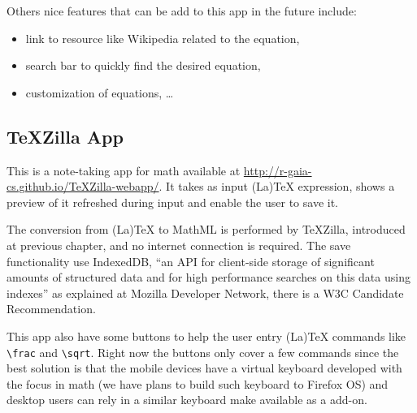 Others nice features that can be add to this app in the
future include:
\begin{itemize}
  \item link to resource like Wikipedia related to the equation,
  \item search bar to quickly find the desired equation,
  \item customization of equations, \ldots
\end{itemize}

\subsection{TeXZilla App}

This is a note-taking app for math available at
\href{http://r-gaia-cs.github.io/TeXZilla-webapp/}{http://r-gaia-cs.github.io/TeXZilla-webapp/}.
It takes as input (La)TeX expression, shows a preview of it refreshed during
input and enable the user to save it.

The conversion from (La)TeX to MathML is performed by TeXZilla, introduced at
previous chapter, and no internet connection is required. The save functionality
use IndexedDB, ``an API for client-side storage of significant amounts of
structured data and for high performance searches on this data using indexes''
as explained at Mozilla Developer Network, there is a W3C Candidate
Recommendation.

This app also have some buttons to help the user entry (La)TeX commands like
{\tt \textbackslash frac} and {\tt \textbackslash sqrt}. Right now the buttons
only cover a few commands since the best solution is that the mobile devices
have a virtual keyboard developed with the focus in math (we have plans to build
such keyboard to Firefox OS) and desktop users can rely in a similar keyboard
make available as a add-on.
